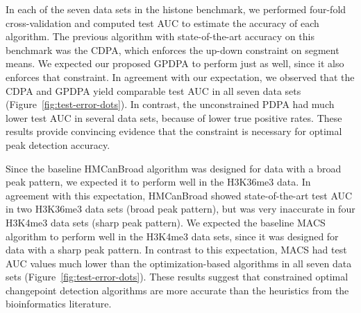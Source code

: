 \documentclass{article}
\begin{document}
In each of the seven data sets in the histone benchmark,
we performed four-fold cross-validation and computed test AUC to
estimate the accuracy of each algorithm. The previous algorithm with
state-of-the-art accuracy on this benchmark was the CDPA, which
enforces the up-down constraint on segment means. We expected our
proposed GPDPA to perform just as well, since it also enforces that
constraint. In agreement with our expectation, we observed that the
CDPA and GPDPA yield comparable test AUC in all seven data sets
(Figure~\ref{fig:test-error-dots}). In contrast, the unconstrained
PDPA had much lower test AUC in several data sets, because of lower
true positive rates. These results provide convincing
evidence that the constraint is necessary for optimal peak detection
accuracy.

Since the baseline HMCanBroad algorithm was designed for data with a
broad peak pattern, we expected it to perform well in the H3K36me3
data. In agreement with this expectation, HMCanBroad showed
state-of-the-art test AUC in two H3K36me3 data sets (broad peak
pattern), but was very inaccurate in four H3K4me3 data sets (sharp
peak pattern). We expected the baseline MACS algorithm to perform well
in the H3K4me3 data sets, since it was designed for data with a sharp
peak pattern. In contrast to this expectation, MACS had test AUC
values much lower than the optimization-based algorithms in all seven
data sets (Figure~\ref{fig:test-error-dots}). These results suggest
that constrained optimal changepoint detection algorithms are more
accurate than the heuristics from the bioinformatics literature.


%   
\end{document}
